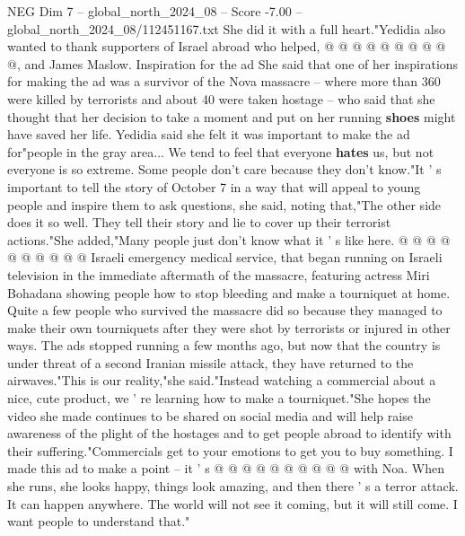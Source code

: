 \begin{textsample}{NEG Dim 7 – global\_north\_2024\_08 – Score -7.00 – global\_north\_2024\_08/112451167.txt}
She did it with a full heart."Yedidia also wanted to thank supporters of Israel abroad who helped, @ @ @ @ @ @ @ @ @ @, and James Maslow.
Inspiration for the ad She said that one of her inspirations for making the ad was a survivor of the Nova massacre -- where more than 360 were killed by terrorists and about 40 were taken hostage -- who said that she thought that her decision to take a moment and put on her running \textbf{shoes} might have saved her life.
Yedidia said she felt it was important to make the ad for"people in the gray area...
We tend to feel that everyone \textbf{hates} us, but not everyone is so extreme.
Some people don't care because they don't know."It ' s important to tell the story of October 7 in a way that will appeal to young people and inspire them to ask questions, she said, noting that,"The other side does it so well.
They tell their story and lie to cover up their terrorist actions."She added,"Many people just don't know what it ' s like here. @ @ @ @ @ @ @ @ @ @ Israeli emergency medical service, that began running on Israeli television in the immediate aftermath of the massacre, featuring actress Miri Bohadana showing people how to stop bleeding and make a tourniquet at home.
Quite a few people who survived the massacre did so because they managed to make their own tourniquets after they were shot by terrorists or injured in other ways.
The ads stopped running a few months ago, but now that the country is under threat of a second Iranian missile attack, they have returned to the airwaves."This is our reality,"she said."Instead watching a commercial about a nice, cute product, we ' re learning how to make a tourniquet."She hopes the video she made continues to be shared on social media and will help raise awareness of the plight of the hostages and to get people abroad to identify with their suffering."Commercials get to your emotions to get you to buy something.
I made this ad to make a point -- it ' s @ @ @ @ @ @ @ @ @ @ with Noa.
When she runs, she looks happy, things look amazing, and then there ' s a terror attack.
It can happen anywhere.
The world will not see it coming, but it will still come.
I want people to understand that."

\end{textsample}
